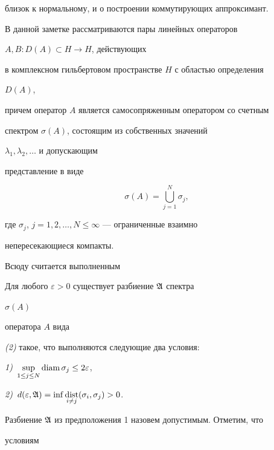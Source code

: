 близок к нормальному, и о построении коммутирующих аппроксимант.





В данной заметке рассматриваются пары линейных операторов


$A,B:D(A)\subset H\to H$, действующих


в комплексном гильбертовом пространстве $H$ с областью определения


$D(A)$,


причем оператор $A$ является самосопряженным оператором со счетным


спектром $\sigma(A)$, состоящим из собственных значений


$\lambda_1,\lambda_2,\dotsc$ и допускающим


представление в виде


\begin{equation}


\sigma(A)=\bigcup\limits^N_{j=1}\sigma_j,


\end{equation}


где $\sigma_j$, $j=1,2,\dotsc,N\le\infty$ --- ограниченные взаимно


непересекающиеся компакты.





Всюду считается выполненным





\begin{assmp}


Для любого $\varepsilon>0$ существует разбиение $\frak A$ спектра


$\sigma(A)$


оператора $A$ вида


{\em (2)} такое, что выполняются следующие два условия:


{\em 1)}~$\sup\limits_{1\le j\le N}\operatorname{diam}\sigma_j\le2\varepsilon$,


{\em 2)}~$d(\varepsilon,\frak A)=


\inf\dist\limits_{i\ne j}(\sigma_i,\sigma_j)>0$.


\end{assmp}





Разбиение $\frak A$ из предположения 1 назовем допустимым. Отметим, что


условиям


